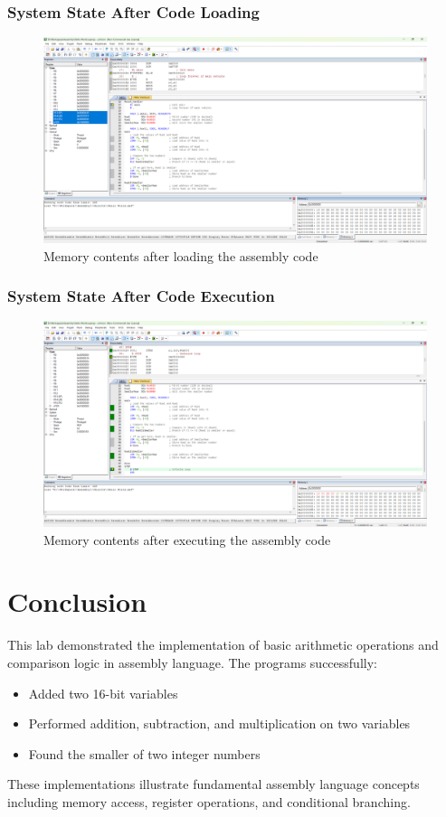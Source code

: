 \documentclass[12pt,a4paper]{article}
\begin{document}
\subsubsection{System State After Code Loading}
\begin{figure}[H]
    \centering
    \includegraphics[width=\textwidth]{ls3.png}
    \caption{Memory contents after loading the assembly code}
    \label{fig:loading3}
\end{figure}

\subsubsection{System State After Code Execution}
\begin{figure}[H]
    \centering
    \includegraphics[width=\textwidth]{es3.png}
    \caption{Memory contents after executing the assembly code}
    \label{fig:execution3}
\end{figure}

\section{Conclusion}
This lab demonstrated the implementation of basic arithmetic operations and comparison logic in assembly language. The programs successfully:
\begin{itemize}
    \item Added two 16-bit variables
    \item Performed addition, subtraction, and multiplication on two variables
    \item Found the smaller of two integer numbers
\end{itemize}

These implementations illustrate fundamental assembly language concepts including memory access, register operations, and conditional branching.
\end{document}
